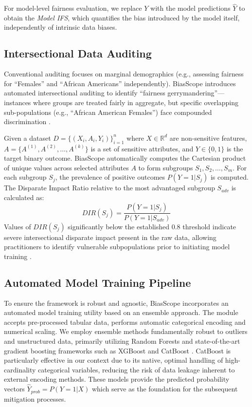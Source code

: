 \documentclass[conference]{IEEEtran}
\begin{document}
For model-level fairness evaluation, we replace $Y$ with the model predictions $\hat{Y}$ to obtain the \emph{Model IFS}, which quantifies the bias introduced by the model itself, independently of intrinsic data biases.

\subsection{Intersectional Data Auditing}
Conventional auditing focuses on marginal demographics (e.g., assessing fairness for ``Females'' and ``African Americans'' independently). BiasScope introduces automated intersectional auditing to identify ``fairness gerrymandering''---instances where groups are treated fairly in aggregate, but specific overlapping sub-populations (e.g., ``African American Females'') face compounded discrimination \cite{kearns2018preventing}.

Given a dataset $D = \{(X_i, A_i, Y_i)\}_{i=1}^n$ where $X \in \mathbb{R}^d$ are non-sensitive features, $A = \{A^{(1)}, A^{(2)}, \dots, A^{(k)}\}$ is a set of sensitive attributes, and $Y \in \{0, 1\}$ is the target binary outcome. BiasScope automatically computes the Cartesian product of unique values across selected attributes $A$ to form subgroups $S_{1}, S_{2}, \dots, S_{m}$. For each subgroup $S_j$, the prevalence of positive outcomes $P(Y=1 | S_j)$ is computed. The Disparate Impact Ratio relative to the most advantaged subgroup $S_{adv}$ is calculated as:
\begin{equation}
DIR(S_j) = \frac{P(Y=1 | S_j)}{P(Y=1 | S_{adv})}
\end{equation}
Values of $DIR(S_j)$ significantly below the established $0.8$ threshold indicate severe intersectional disparate impact present in the raw data, allowing practitioners to identify vulnerable subpopulations prior to initiating model training \cite{feldman2015certifying}.

\subsection{Automated Model Training Pipeline}
To ensure the framework is robust and agnostic, BiasScope incorporates an automated model training utility based on an ensemble approach. The module accepts pre-processed tabular data, performs automatic categorical encoding and numerical scaling. We employ ensemble methods fundamentally robust to outliers and unstructured data, primarily utilizing Random Forests and state-of-the-art gradient boosting frameworks such as XGBoost \cite{chen2016xgboost} and CatBoost \cite{dorogush2018catboost}. CatBoost is particularly effective in our context due to its native, optimal handling of high-cardinality categorical variables, reducing the risk of data leakage inherent to external encoding methods. These models provide the predicted probability vectors $\hat{Y}_{prob} = P(Y=1 | X)$ which serve as the foundation for the subsequent mitigation processes.
\end{document}
